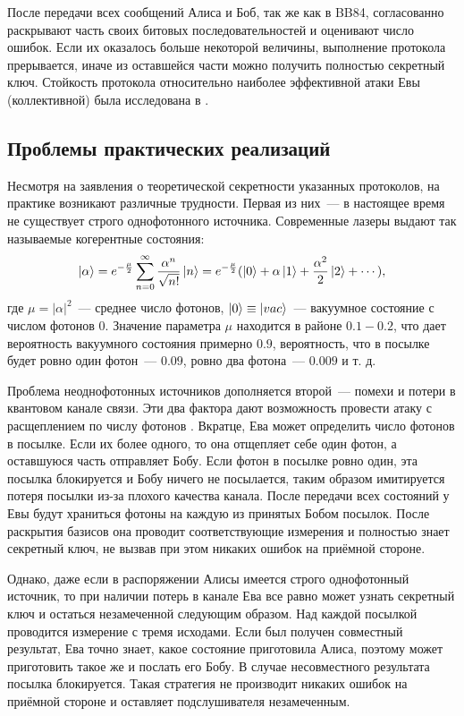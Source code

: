После передачи всех сообщений Алиса и Боб, так же как в BB84, согласованно раскрывают часть своих битовых последовательностей и оценивают число ошибок. Если их оказалось больше некоторой величины, выполнение протокола прерывается, иначе из оставшейся части можно получить полностью секретный ключ. Стойкость протокола относительно наиболее эффективной атаки Евы (коллективной) была исследована в \cite{b92_security_proof}.

\subsection{Проблемы практических реализаций}
Несмотря на заявления о теоретической секретности указанных протоколов, на практике возникают различные трудности.
Первая из них~--- в настоящее время не существует строго однофотонного источника. Современные лазеры выдают так называемые когерентные состояния:
\begin{equation}
\left| \alpha \right\rangle = e^{-\frac{\mu}{2}} \sum_{n=0}^\infty \frac{\alpha^n}{\sqrt{n!}} \left| n \right\rangle = e^{-\frac{\mu}{2}}(\left| 0 \right\rangle + \alpha \left| 1 \right\rangle + \frac{\alpha^2}{2}\left| 2 \right\rangle + \cdots),   
\end{equation}
где $\mu = |\alpha|^2$~--- среднее число фотонов, $\left| 0 \right\rangle \equiv \left| vac \right\rangle$~--- вакуумное состояние с числом фотонов 0. Значение параметра $\mu$ находится в районе $0.1-0.2$, что дает вероятность вакуумного состояния примерно $0.9$, вероятность, что в посылке будет ровно один фотон~--- $0.09$, ровно два фотона~--- $0.009$ и т. д.

Проблема неоднофотонных источников дополняется второй~--- помехи и потери в квантовом канале связи. Эти два фактора дают возможность провести атаку с расщеплением по числу фотонов \cite{pns_attack}. Вкратце, Ева может определить число фотонов в посылке. Если их более одного, то она отщепляет себе один фотон, а оставшуюся часть отправляет Бобу. Если фотон в посылке ровно один, эта посылка блокируется и Бобу ничего не посылается, таким образом имитируется потеря посылки из-за плохого качества канала.
После передачи всех состояний у Евы будут храниться фотоны на каждую из принятых Бобом посылок. После раскрытия базисов она проводит соответствующие измерения и полностью знает секретный ключ, не вызвав при этом никаких ошибок на приёмной стороне.

Однако, даже если в распоряжении Алисы имеется строго однофотонный источник, то при наличии потерь в канале Ева все равно может узнать \cite{uds_attack} секретный ключ и остаться незамеченной следующим образом. Над каждой посылкой проводится измерение с тремя исходами. Если был получен совместный результат, Ева точно знает, какое состояние приготовила Алиса, поэтому может приготовить такое же и послать его Бобу. В случае несовместного результата посылка блокируется. Такая стратегия не производит никаких ошибок на приёмной стороне и оставляет подслушивателя незамеченным.

